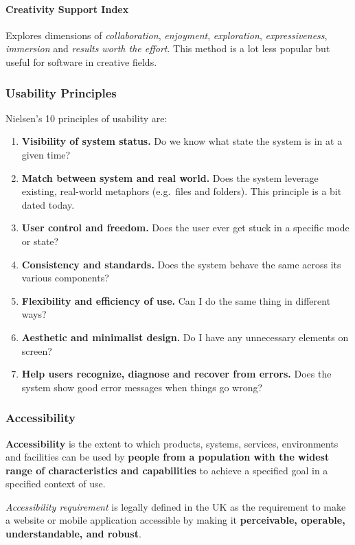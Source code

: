 \paragraph{Creativity Support Index} Explores dimensions of \emph{collaboration}, \emph{enjoyment}, \emph{exploration}, \emph{expressiveness}, \emph{immersion} and \emph{results worth the effort}. This method is a lot less popular but useful for software in creative fields.

\subsubsection{Usability Principles}

Nielsen's 10 principles of usability are:

\begin{enumerate}
	\item \textbf{Visibility of system status.} Do we know what state the system is in at a given time? 
	\item \textbf{Match between system and real world.} Does the system leverage existing, real-world metaphors (e.g.\ files and folders). This principle is a bit dated today.
	\item \textbf{User control and freedom.} Does the user ever get stuck in a specific mode or state? 
	\item \textbf{Consistency and standards.} Does the system behave the same across its various components?
	\item \textbf{Flexibility and efficiency of use.} Can I do the same thing in different ways?
	\item \textbf{Aesthetic and minimalist design.} Do I have any unnecessary elements on screen?
	\item \textbf{Help users recognize, diagnose and recover from errors.} Does the system show good error messages when things go wrong? 
\end{enumerate}

\subsubsection{Accessibility}

\textbf{Accessibility} is the extent to which products, systems, services, environments and facilities can be used by \textbf{people from a population with the widest range of characteristics and capabilities} to achieve a specified goal in a specified context of use.

\emph{Accessibility requirement}  is legally defined in the UK as the requirement to make a website or mobile application accessible by making it \textbf{perceivable, operable, understandable, and robust}. 

